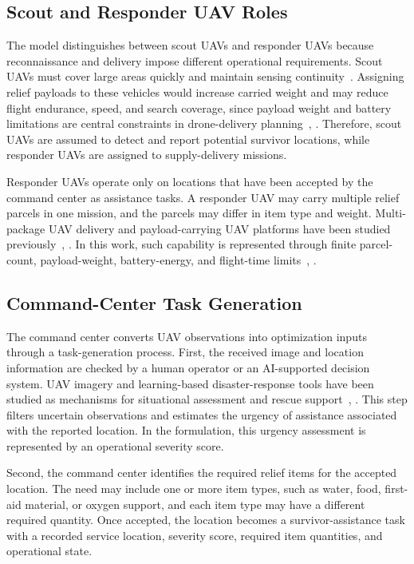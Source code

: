 \documentclass[conference]{IEEEtran}
\begin{document}
\subsection{Scout and Responder UAV Roles}

The model distinguishes between scout UAVs and responder UAVs because reconnaissance and delivery impose different operational requirements. Scout UAVs must cover large areas quickly and maintain sensing continuity~\cite{ref_pdsr}. Assigning relief payloads to these vehicles would increase carried weight and may reduce flight endurance, speed, and search coverage, since payload weight and battery limitations are central constraints in drone-delivery planning~\cite{ref_delivery_survey}, \cite{ref_drone_vrp}. Therefore, scout UAVs are assumed to detect and report potential survivor locations, while responder UAVs are assigned to supply-delivery missions.

Responder UAVs operate only on locations that have been accepted by the command center as assistance tasks. A responder UAV may carry multiple relief parcels in one mission, and the parcels may differ in item type and weight. Multi-package UAV delivery and payload-carrying UAV platforms have been studied previously~\cite{ref_multipackage_uav}, \cite{ref_payload_platform}. In this work, such capability is represented through finite parcel-count, payload-weight, battery-energy, and flight-time limits~\cite{ref_delivery_survey}, \cite{ref_drone_vrp}.

\subsection{Command-Center Task Generation}

The command center converts UAV observations into optimization inputs through a task-generation process. First, the received image and location information are checked by a human operator or an AI-supported decision system. UAV imagery and learning-based disaster-response tools have been studied as mechanisms for situational assessment and rescue support~\cite{ref_uav_disaster_survey}, \cite{ref_pdsr}. This step filters uncertain observations and estimates the urgency of assistance associated with the reported location. In the formulation, this urgency assessment is represented by an operational severity score.

Second, the command center identifies the required relief items for the accepted location. The need may include one or more item types, such as water, food, first-aid material, or oxygen support, and each item type may have a different required quantity. Once accepted, the location becomes a survivor-assistance task with a recorded service location, severity score, required item quantities, and operational state.
\end{document}
